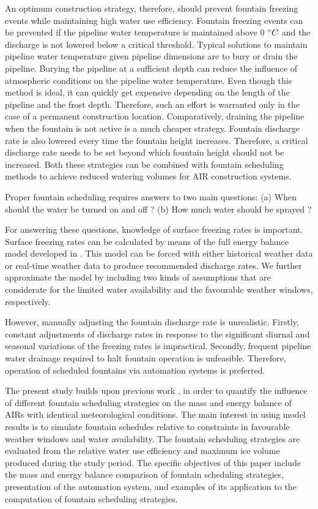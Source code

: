 \documentclass[tc, manuscript]{copernicus}
\begin{document}
An optimum construction strategy, therefore, should prevent fountain freezing events while maintaining high
water use efficiency. Fountain freezing events can be prevented if the pipeline water temperature is maintained
above 0 $^{\circ} C$ and the discharge is not lowered below a critical threshold. Typical solutions to maintain
pipeline water temperature given pipeline dimensions are to bury or drain the pipeline. Burying the pipeline at
a sufficient depth can reduce the influence of atmospheric conditions on the pipeline water temperature. Even
though this method is ideal, it can quickly get expensive depending on the length of the pipeline and the frost
depth. Therefore, such an effort is warranted only in the case of a permanent construction location.
Comparatively, draining the pipeline when the fountain is not active is a much cheaper strategy. Fountain
discharge rate is also lowered every time the fountain height increases. Therefore, a critical discharge rate needs
to be set beyond which fountain height should not be increased. Both these strategies can be combined
with fountain scheduling methods to achieve reduced watering volumes for AIR construction systems. 

Proper fountain scheduling requires answers to two main questions: 
(a) When should the water be turned on and off ?
(b) How much water should be sprayed ? 

For answering these questions, knowledge of surface freezing rates is important. Surface freezing rates can be
calculated by means of the full energy balance model developed in
\cite{balasubramanianInfluenceMeteorologicalConditions2022}. This model can be forced with either historical
weather data or real-time weather data to produce recommended discharge rates. We further approximate the model
by including two kinds of assumptions that are considerate for the limited water availability and the favourable
weather windows, respectively.

However, manually adjusting the fountain discharge rate is unrealistic. Firstly, constant adjustments of
discharge rates in response to the significant diurnal and seasonal variations of the freezing rates is
impractical. Secondly, frequent pipeline water drainage required to halt fountain operation is unfeasible.
Therefore, operation of scheduled fountains via automation systems is preferred.

The present study builds upon previous work \citep{balasubramanianInfluenceMeteorologicalConditions2022,
oerlemansBriefCommunicationGrowth2021}, in order to quantify the influence of different fountain scheduling
strategies on the mass and energy balance of AIRs with identical meteorological conditions. The main interest in
using model results is to simulate fountain schedules relative to constraints in favourable weather windows and
water availability. The fountain scheduling strategies are evaluated from the relative water use efficiency and
maximum ice volume produced during the study period. The specific objectives of this paper include the mass and
energy balance comparison of fountain scheduling strategies, presentation of the automation system, and examples
of its application to the computation of fountain scheduling strategies.
\end{document}
